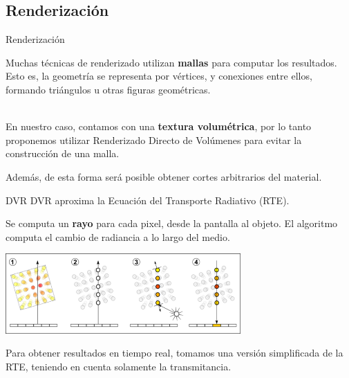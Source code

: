 \documentclass[spanish,unknownkeysallowed]{beamer}
\begin{document}
\subsection{Renderización}

\begin{frame}{Renderización}

Muchas técnicas de renderizado utilizan \textbf{mallas} para computar los resultados.
Esto es, la geometría se representa por vértices, y conexiones entre ellos, formando triángulos u otras figuras geométricas.

\ \\

En nuestro caso, contamos con una \textbf{textura volumétrica}, por lo tanto proponemos utilizar Renderizado Directo de Volúmenes para evitar la construcción de una malla.

Además, de esta forma será posible obtener cortes arbitrarios del material.

\end{frame}

\begin{frame}{DVR}
DVR aproxima la Ecuación del Transporte Radiativo (RTE).

Se computa un \textbf{rayo} para cada pixel, desde la pantalla al objeto. El algoritmo computa el cambio de radiancia a lo largo del medio.


\centerline{\includegraphics[width=9cm]{../figures/dvr}}

Para obtener resultados en tiempo real, tomamos una versión simplificada de la RTE, teniendo en cuenta solamente la transmitancia.
\end{frame}
\end{document}
